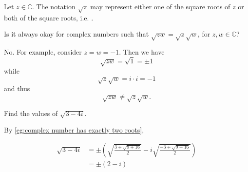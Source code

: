 \documentclass[notoc,notitlepage]{tufte-book}
\begin{document}
\begin{remark}
	Let $z \in \mathbb{C}$. The notation $\sqrt{z}$ may represent either one of the square roots of $z$ or both of the square roots, i.e. .
\end{remark}

\begin{ex}\label{ex:Separation of Multiplication in Square Roots}
	Is it always okay for complex numbers such that $\sqrt{zw} = \sqrt{z} \sqrt{w}$, for $z, w \in \mathbb{C}$?

	No. For example, consider $z = w = -1$. Then we have
	\begin{equation*}
		\sqrt{zw} = \sqrt{1} = \pm 1
	\end{equation*}
	while
	\begin{equation*}
		\sqrt{z} \sqrt{w} = i \cdot i = -1
	\end{equation*}
	and thus
	\begin{equation*}
		\sqrt{zw} \neq \sqrt{z} \sqrt{w}.
	\end{equation*}
\end{ex}

\begin{eg}
	Find the values of $\sqrt{3 - 4i}$.

	By \cref{eg:complex number has exactly two roots},

	\begin{align*}
		\sqrt{3 - 4i} &= \pm \left( \sqrt{\frac{3 + \sqrt{9 + 16}}{2}} - i \sqrt{\frac{-3 + \sqrt{9 + 16}}{2}} \right) \\
			&= \pm (2 - i)
	\end{align*}
\end{eg}
\end{document}
